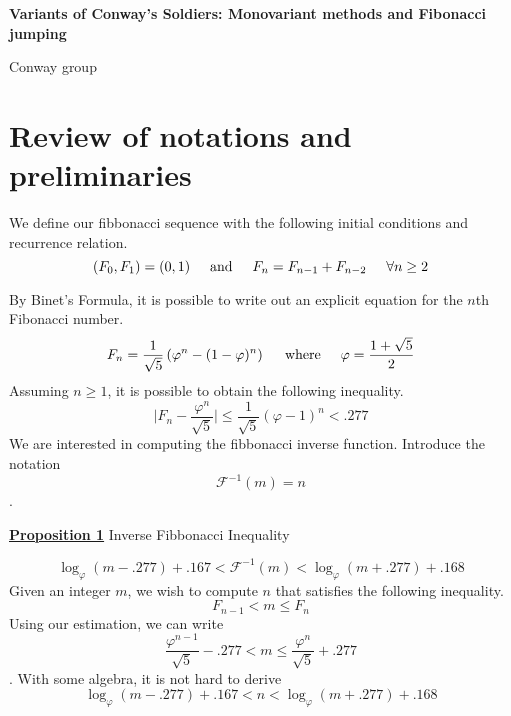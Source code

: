 \documentclass{article}
\newcommand{\new}[1]{
    \vspace{2mm}
    \noindent
    \textbf{
    \underline{#1}}
}
\newcommand{\textAnd}{
    {
        \hspace{5mm}
        \textrm{and}
        \hspace{5mm}
    }
}
\newcommand{\textWhere}{
    {
        \hspace{5mm}
        \textrm{where}
        \hspace{5mm}
    }
}
\begin{document}
\begin{center}
    \Large
    \textbf{Variants of Conway's Soldiers: Monovariant 
    methods and Fibonacci jumping}

    \large
    Conway group
\end{center}



\section{Review of notations and preliminaries}

We define our fibbonacci sequence with the following initial 
conditions and recurrence relation. 
\[
    (F_0, F_1) = (0, 1)
    \textAnd 
    F_n = F_{n - 1} + F_{n - 2} \hspace{5mm}\forall n \geq 2
\]

By Binet's Formula, it is possible to write out an explicit equation 
for the $n$th Fibonacci number. 
\[
    F_n =
    \frac 1 {\sqrt 5} 
    \left(
        \varphi^n - (1 - \varphi)^n 
    \right)
    \textWhere 
    \varphi = \frac {1 + \sqrt 5} 2
\]  
Assuming $n \geq 1$, it is possible to obtain the following inequality. 
\[
    \bigg|F_n  - \frac {\varphi^n} {\sqrt 5}\bigg| \leq \frac 1 {\sqrt 5}(\varphi - 1)^n 
    < .277
\]
We are interested in computing the fibbonacci inverse function. 
Introduce the notation 
\[
    \mathcal{F}^{-1} (m) = n
\]. 

\new{Proposition 1} Inverse Fibbonacci Inequality 

\[
    \log_{\varphi}(m - .277) +.167 <  \mathcal{F}^{-1} (m) < \log_{\varphi}(m + .277) +.168
\]
\proof
Given an integer $m$, we wish to compute $n$ that satisfies the following 
inequality. 
\begin{equation}
    \label{invfib}
    F_{n - 1} < m \leq F_{n}
\end{equation}
Using our estimation, we can write 
\begin{equation*}
 \frac {\varphi^{n - 1}} {\sqrt 5} - .277
    <
    m \leq  \frac {\varphi^n} {\sqrt 5} + .277
\end{equation*}.
With some algebra, it is not hard to derive
\begin{equation}
    \log_{\varphi}(m - .277) +.167 < n < \log_{\varphi}(m + .277) +.168
\end{equation}
\end{document}
